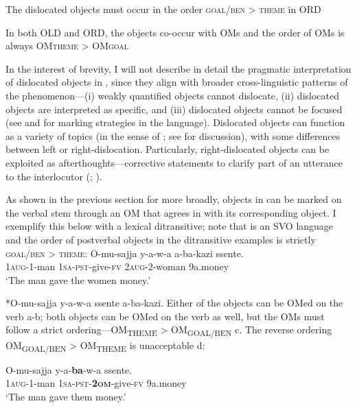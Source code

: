 \documentclass[output=paper,newtxmath,modfonts,nonflat,hidelinks]{langsci/langscibook}
\begin{document}
\ex\label{ex:ranero:7bii}  The dislocated objects must occur in the order \textsc{goal/ben > theme} in ORD

\ex\label{ex:ranero:7biii}  In both OLD and ORD, the objects co-occur with OMs and the order of OMs is always OM\textsc{theme} > OM\textsc{goal}
\z
\z
\z

In the interest of brevity, I will not describe in detail the pragmatic interpretation of dislocated objects in , since they align with broader cross-linguistic patterns of the phenomenon—(i) weakly quantified objects cannot dislocate, (ii) dislocated objects are interpreted as specific, and (iii) dislocated objects cannot be focused (see \citealt{Hyman1993} and \citealt{vanderwal2016} for  marking strategies in the language). Dislocated objects can function as a variety of topics (in the sense of \citealt{Reinhart1981}; see \citealt{ranero2015} for discussion), with some differences between left or right-dislocation. Particularly, right-dislocated objects can be exploited as afterthoughts—corrective statements to clarify part of an utterance to the interlocutor (\citealt{grosz1998}; \citealt{Villalba2000}). 

As shown in the previous section for  more broadly, objects in  can be marked on the verbal stem through an OM that agrees in  with its corresponding object. I exemplify this below with a lexical ditransitive; note that  is an SVO language and the order of postverbal objects in the ditransitive examples is strictly \textsc{goal/ben > theme}:
\ea\label{ex:ranero:8}
\ea\label{ex:ranero:8a}
\gll O-mu-sajja    y-a-w-a          a-ba-kazi   ssente.\\
\textsc{1aug-}1-man \textsc{1sa-pst}{}-give-\textsc{fv} 2\textsc{aug}{}-2-woman 9a.money\\
\glt ‘The man gave the women money.’

\ex\label{ex:ranero:8b}*O-mu-sajja y-a-w-a ssente a-ba-kazi.
\z
\z
Either of the objects can be OMed on the verb a-b; both objects can be OMed on the verb as well, but the OMs must follow a strict ordering—OM\textsubscript{THEME} > OM\textsubscript{GOAL/BEN} c. The reverse ordering OM\textsubscript{GOAL/BEN} >\textsubscript{} OM\textsubscript{THEME} is unacceptable d:

\ea\label{ex:ranero:9}
\ea\label{ex:ranero:9a}
\gll O-mu-sajja    y-a-\textbf{ba}{}-w-a                  ssente.\\
1\textsc{aug}{}-1-man \textsc{1sa-pst-}\textbf{\textsc{2om}}{}-give-\textsc{fv} 9a.money\\
\glt ‘The man gave them money.’
\end{document}

